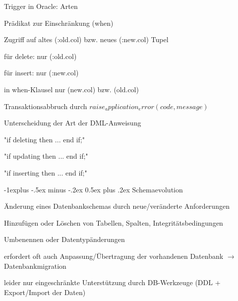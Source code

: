 \documentclass[a4paper]{article}
\makeatletter
\renewcommand{\subsection}{\@startsection{subsection}{2}{0mm}%
                                {-1explus -.5ex minus -.2ex}%
                                {0.5ex plus .2ex}%
                                {\normalfont\normalsize\bfseries}}
\makeatother
\begin{document}
\begin{multicols}{3}
\begin{itemize*}
        Trigger in Oracle: Arten
        \begin{itemize*}
            \item Prädikat zur Einschränkung (when)
            \item Zugriff auf altes (:old.col) bzw. neues (:new.col) Tupel
            \begin{itemize*}
                \item für delete: nur (:old.col)
                \item für insert: nur (:new.col)
                \item in when-Klausel nur (new.col) bzw. (old.col)
            \end{itemize*}
            \item Transaktionsabbruch durch $raise_application_error(code, message)$
            \item Unterscheidung der Art der DML-Anweisung
            \begin{itemize*}
                \item "if deleting then ... end if;"
                \item "if updating then ... end if;"
                \item "if inserting then ... end if;"
            \end{itemize*}
        \end{itemize*}

        \subsection{Schemaevolution}
        \begin{itemize*}
            \item Änderung eines Datenbankschemas durch neue/veränderte Anforderungen
            \begin{itemize*}
                \item Hinzufügen oder Löschen von Tabellen, Spalten, Integritätsbedingungen
                \item Umbenennen oder Datentypänderungen
            \end{itemize*}
            \item erfordert oft auch Anpassung/Übertragung der vorhandenen Datenbank $\rightarrow$ Datenbankmigration
            \item leider nur eingeschränkte Unterstützung durch DB-Werkzeuge (DDL + Export/Import der Daten)
        \end{itemize*}


\end{itemize*}
\end{multicols}
\end{document}
